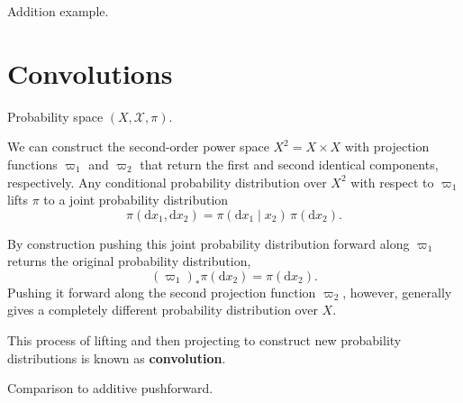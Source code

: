 \documentclass[11pt, oneside]{article}
\begin{document}
Addition example.

\section{Convolutions}

Probability space $(X, \mathcal{X}, \pi)$.

We can construct the second-order power space $X^{2} = X \times X$ with projection 
functions $\varpi_{1}$ and $\varpi_{2}$ that return the first and second identical 
components, respectively.  Any conditional probability distribution over $X^{2}$ 
with respect to $\varpi_{1}$ lifts $\pi$ to a joint probability distribution
%
\begin{equation*}
\pi( \mathrm{d} x_{1}, \mathrm{d} x_{2}) = \pi( \mathrm{d} x_{1} \mid x_{2} ) \, \pi( \mathrm{d} x_{2} ).
\end{equation*}

By construction pushing this joint probability distribution forward along $\varpi_{1}$ 
returns the original probability distribution,
%
\begin{equation*}
(\varpi_{1})_{*} \pi ( \mathrm{d} x_{2}) = \pi( \mathrm{d} x_{2}).
\end{equation*}
%
Pushing it forward along the second projection function $\varpi_{2}$, however, generally 
gives a completely different probability distribution over $X$.

This process of lifting and then projecting to construct new probability distributions 
is known as \textbf{convolution}.

Comparison to additive pushforward.
\end{document}

